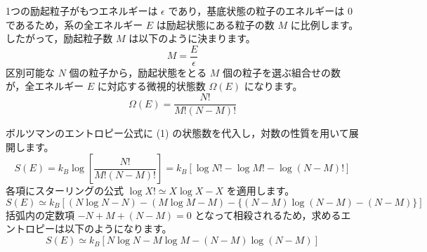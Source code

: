 \solutionheading
\begin{solutionparts}

1つの励起粒子がもつエネルギーは $\epsilon$ であり，基底状態の粒子のエネルギーは $0$ であるため，系の全エネルギー $E$ は励起状態にある粒子の数 $M$ に比例します。したがって，励起粒子数 $M$ は以下のように決まります。
\begin{equation*}
M = \frac{E}{\epsilon}
\end{equation*}
区別可能な $N$ 個の粒子から，励起状態をとる $M$ 個の粒子を選ぶ組合せの数が，全エネルギー $E$ に対応する微視的状態数 $\Omega(E)$ になります。
\begin{equation*}
\Omega(E) = \frac{N!}{M!(N-M)!}
\end{equation*}

ボルツマンのエントロピー公式に (1) の状態数を代入し，対数の性質を用いて展開します。
\begin{equation*}
S(E) = k_B \log \left[ \frac{N!}{M!(N-M)!} \right] = k_B \left[ \log N! - \log M! - \log (N-M)! \right]
\end{equation*}
各項にスターリングの公式 $\log X! \simeq X \log X - X$ を適用します。
\begin{equation*}
S(E) \simeq k_B \left[ (N \log N - N) - (M \log M - M) - \{ (N-M) \log (N-M) - (N-M) \} \right]
\end{equation*}
括弧内の定数項 $-N + M + (N-M) = 0$ となって相殺されるため，求めるエントロピーは以下のようになります。
\begin{equation*}
S(E) \simeq k_B \left[ N \log N - M \log M - (N-M) \log (N-M) \right]
\end{equation*}


\end{solutionparts}
